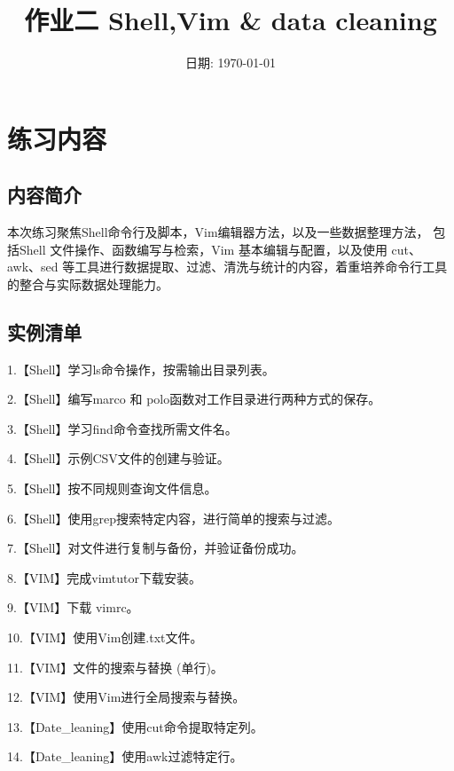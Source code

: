 \documentclass[cn,12pt]{report}
\title{作业二 \quad Shell,Vim \& data cleaning} %
\date{日期: \today} %
\institute{中国海洋大学·信息科学与工程学部·计算机学院} %
\begin{document}
\maketitle



\section{练习内容}
\subsection{内容简介}
  本次练习聚焦Shell命令行及脚本，Vim编辑器方法，以及一些数据整理方法，
  包括Shell 文件操作、函数编写与检索，Vim 基本编辑与配置，以及使用 cut、awk、sed 
  等工具进行数据提取、过滤、清洗与统计的内容，着重培养命令行工具的整合与实际数据处理能力。


\subsection{实例清单}
  1.【Shell】学习ls命令操作，按需输出目录列表。

  2.【Shell】编写marco 和 polo函数对工作目录进行两种方式的保存。

  3.【Shell】学习find命令查找所需文件名。

  4.【Shell】示例CSV文件的创建与验证。

  5.【Shell】按不同规则查询文件信息。

  6.【Shell】使用grep搜索特定内容，进行简单的搜索与过滤。

  7.【Shell】对文件进行复制与备份，并验证备份成功。

  8.【VIM】完成vimtutor下载安装。

  9.【VIM】下载 vimrc。

  10.【VIM】使用Vim创建.txt文件。

  11.【VIM】文件的搜索与替换 (单行)。
  
  12.【VIM】使用Vim进行全局搜索与替换。

  13.【Date\_leaning】使用cut命令提取特定列。

  14.【Date\_leaning】使用awk过滤特定行。
\end{document}
